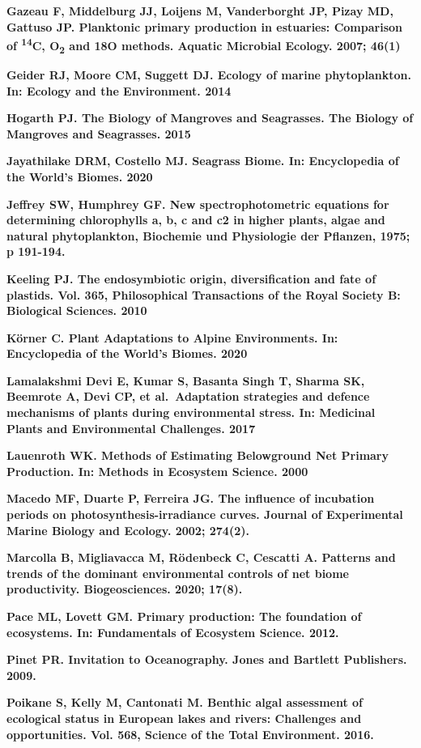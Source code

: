 \documentclass[
]{article}
\begin{document}
\textbf{Gazeau F, Middelburg JJ, Loijens M, Vanderborght JP, Pizay MD,
Gattuso JP. Planktonic primary production in estuaries: Comparison of
\textsuperscript{14}C, O\textsubscript{2} and 18O methods. Aquatic
Microbial Ecology. 2007; 46(1)}

\textbf{Geider RJ, Moore CM, Suggett DJ. Ecology of marine
phytoplankton. In: Ecology and the Environment. 2014}

\textbf{Hogarth PJ. The Biology of Mangroves and Seagrasses. The Biology
of Mangroves and Seagrasses. 2015}

\textbf{Jayathilake DRM, Costello MJ. Seagrass Biome. In: Encyclopedia
of the World's Biomes. 2020}

\textbf{Jeffrey SW, Humphrey GF. New spectrophotometric equations for
determining chlorophylls a, b, c and c2 in higher plants, algae and
natural phytoplankton, Biochemie und Physiologie der Pflanzen, 1975; p
191-194.}

\textbf{Keeling PJ. The endosymbiotic origin, diversification and fate
of plastids. Vol. 365, Philosophical Transactions of the Royal Society
B: Biological Sciences. 2010}

\textbf{Körner C. Plant Adaptations to Alpine Environments. In:
Encyclopedia of the World's Biomes. 2020}

\textbf{Lamalakshmi Devi E, Kumar S, Basanta Singh T, Sharma SK,
Beemrote A, Devi CP, et al.~Adaptation strategies and defence mechanisms
of plants during environmental stress. In: Medicinal Plants and
Environmental Challenges. 2017}

\textbf{Lauenroth WK. Methods of Estimating Belowground Net Primary
Production. In: Methods in Ecosystem Science. 2000}

\textbf{Macedo MF, Duarte P, Ferreira JG. The influence of incubation
periods on photosynthesis-irradiance curves. Journal of Experimental
Marine Biology and Ecology. 2002; 274(2).}

\textbf{Marcolla B, Migliavacca M, Rödenbeck C, Cescatti A. Patterns and
trends of the dominant environmental controls of net biome productivity.
Biogeosciences. 2020; 17(8).}

\textbf{Pace ML, Lovett GM. Primary production: The foundation of
ecosystems. In: Fundamentals of Ecosystem Science. 2012.}

\textbf{Pinet PR. Invitation to Oceanography. Jones and Bartlett
Publishers. 2009.}

\textbf{Poikane S, Kelly M, Cantonati M. Benthic algal assessment of
ecological status in European lakes and rivers: Challenges and
opportunities. Vol. 568, Science of the Total Environment. 2016.}
\end{document}
